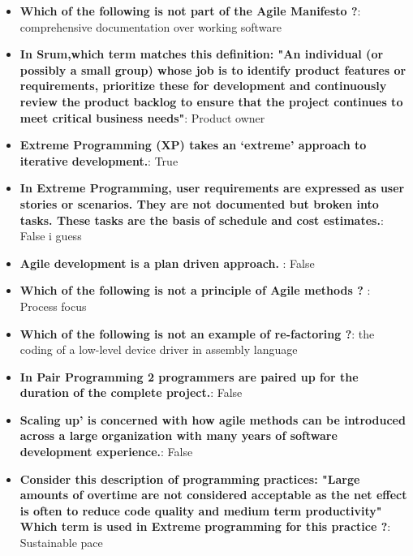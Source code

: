 \documentclass{report}
\begin{document}
    \pagebreak 
    \begin{itemize}
        \item \textbf{Which of the following is not part of the Agile Manifesto ?}: comprehensive documentation over working software 
        \item \textbf{In Srum,which term matches this definition: "An individual (or possibly a small group) whose job is to identify product features or requirements, prioritize these for development and continuously review the product backlog to ensure that the project continues to meet critical business needs"}: Product owner
        \item \textbf{Extreme Programming (XP) takes an ‘extreme’ approach to iterative development.}: True
        \item \textbf{In Extreme Programming, user requirements are expressed as user stories or scenarios. They are not documented but broken into tasks. These tasks are the basis of schedule and cost estimates.}: False i guess
        \item \textbf{Agile development is a plan driven approach. }: False
        \item \textbf{Which of the following is not a principle of Agile methods ? }: Process focus
        \item \textbf{Which of the following is not an example of re-factoring ?}: the coding of a low-level device driver in assembly language
        \item \textbf{In Pair Programming 2 programmers are paired up for the duration of the complete project.}: False
        \item \textbf{Scaling up’ is concerned with how agile methods can be introduced across a large organization with many years of software development experience.}: False
        \item \textbf{Consider this description of programming practices: "Large amounts of overtime are not considered acceptable as the net effect is often to reduce code quality and medium term productivity" Which term is used in Extreme programming for this practice ?}: Sustainable pace


    \end{itemize}
    
\end{document}
